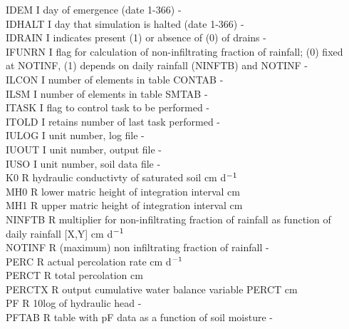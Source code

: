 \documentclass[11pt]{article}
\begin{document}
\begin{tabbing}
IDEM\> \> I\> day of emergence (date 1-366)\> \> \> \> \> \> \> -\\
IDHALT\> \> I\> day that simulation is halted (date 1-366)\> \> \> \> \> \> \> -\\
IDRAIN\> \> I\> indicates present (1) or absence of (0) of drains\> \> \> \> \> \> \> -\\
IFUNRN\> \> I\> flag for calculation of non-infiltrating fraction of rainfall; (0) fixed\\
 \>\> \> at NOTINF, (1) depends on daily rainfall (NINFTB) and NOTINF\> \> \> \> \> \> \> -\\
ILCON\> \> I\> number of elements in table CONTAB\> \> \> \> \> \> \> -\\
ILSM\> \> I\> number of elements in table SMTAB\> \> \> \> \> \> \> -\\
ITASK\> \> I\> flag to control task to be performed\> \> \> \> \> \> \> -\\
ITOLD\> \> I\> retains number of last task performed\> \> \> \> \> \> \> -\\
IULOG\> \> I\> unit number, log file\> \> \> \> \> \> \> -\\
IUOUT\> \> I\> unit number, output file\> \> \> \> \> \> \> -\\
IUSO\> \> I\> unit number, soil data file \> \> \> \> \> \> \> -\\
K0\> \> R\> hydraulic conductivty of saturated soil\> \> \> \> \> \> \> cm d$^{{\rm -1}}$\\
MH0\> \> R\> lower matric height of integration interval\> \> \> \> \> \> \> cm\\
MH1\> \> R\> upper matric height of integration interval\> \> \> \> \> \> \> cm\\
NINFTB\> \> R\> multiplier for non-infiltrating fraction of rainfall as function of\\
\>\> \> daily rainfall [X,Y]\> \> \> \> \> \> \> cm d$^{{\rm -1}}$\\
NOTINF\> \> R\> (maximum) non infiltrating fraction of rainfall\> \> \> \> \> \> \> -\\
PERC\> \> R\> actual percolation rate\> \> \> \> \> \> \> cm d$^{{\rm -1}}$\\
PERCT\> \> R\> total percolation\> \> \> \> \> \> \> cm\\
PERCTX\> \> R\> output cumulative water balance variable PERCT\> \> \> \> \> \> \> cm\\
PF\> \> R\> 10log of hydraulic head\> \> \> \> \> \> \> -\\
PFTAB\> \> R\> table with pF data as a function of soil moisture\> \> \> \> \> \> \> -\\

\end{tabbing}
\end{document}
